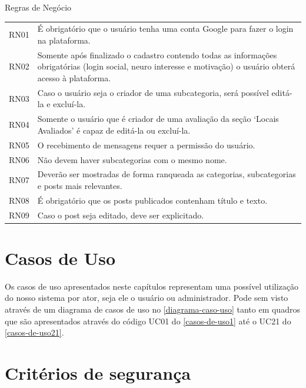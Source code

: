 \begin{quadro}[htb]
	\centering
	\ABNTEXfontereduzida
	\caption[Regras de Negócio]{Regras de Negócio}
	\label{regra-negocio}
	\begin{tabular}{|p{3.3cm}|p{10.3cm}|}
		\hline
		\thead{Código} & \thead{Regra de negócio} \\
		\hline
		RN01 & É obrigatório que o usuário tenha uma conta Google para fazer o login na plataforma. \\
		\hline
		RN02 & Somente após finalizado o cadastro contendo todas as informações obrigatórias (login social, neuro interesse e motivação) o usuário obterá acesso à plataforma.\\
		\hline
		RN03 & Caso o usuário seja o criador de uma subcategoria, será possível editá-la e excluí-la.  \\
		\hline
		RN04 & Somente o usuário que é criador de uma avaliação da seção ‘Locais Avaliados’ é capaz de editá-la ou excluí-la. \\
		\hline
		RN05 & O recebimento de mensagens requer a permissão do usuário. \\
		\hline
		RN06 & Não devem haver subcategorias com o mesmo nome. \\
		\hline
		RN07 & Deverão ser mostradas de forma ranqueada as categorias, subcategorias e posts mais relevantes.\\
		\hline
		RN08 & É obrigatório que os posts publicados contenham título e texto.\\
		\hline
		RN09 & Caso o post seja editado, deve ser explicitado.\\
		\hline
	\end{tabular}
\end{quadro}\pagebreak

\section{Casos de Uso}
Os casos de uso apresentados neste capítulos representam uma possível utilização do nosso sistema por ator, seja ele o usuário ou administrador. Pode sem visto através de um diagrama de casos de uso no \autoref{diagrama-caso-uso} tanto em quadros que são apresentados através do código UC01 do \autoref{casos-de-uso1} até o UC21 do \autoref{casos-de-uso21}. \\




\section{Critérios de segurança}


